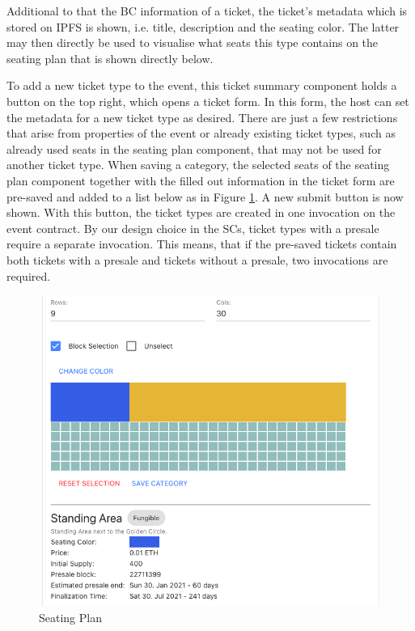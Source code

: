 Additional to that the BC information of a ticket, the ticket's metadata which is stored on IPFS is shown, i.e. title, description and the seating color. The latter may then directly be used to visualise what seats this type contains on the seating plan that is shown directly below.

To add a new ticket type to the event, this ticket summary component holds a button on the top right, which opens a ticket form. In this form, the host can set the metadata for a new ticket type as desired. There are just a few restrictions that arise from properties of the event or already existing ticket types, such as already used seats in the seating plan component, that may not be used for another ticket type. When saving a category, the selected seats of the seating plan component together with the filled out information in the ticket form are pre-saved and added to a list below as in Figure \ref{img:host-seating-plan}. A new submit button is now shown. With this button, the ticket types are created in one invocation on the event contract. By our design choice in the SCs, ticket types with a presale require a separate invocation. This means, that if the pre-saved tickets contain both tickets with a presale and tickets without a presale, two invocations are required.

\begin{figure}[H]
    \centering
    \includegraphics[width=14cm]{images/host-seating-plan.png}
    \caption{Seating Plan \protect}
    \label{img:host-seating-plan}
\end{figure}

